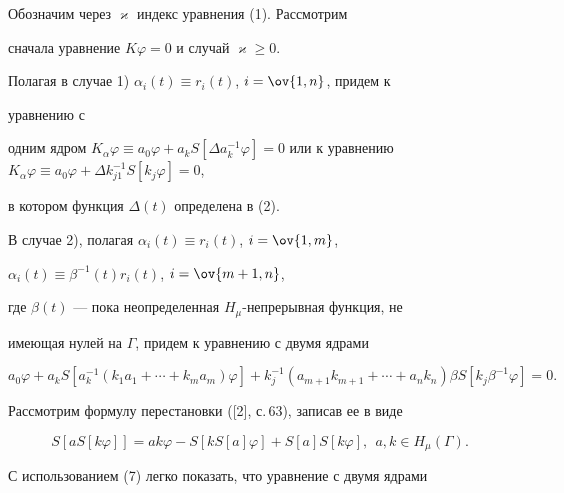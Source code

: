  


\begin{pf} 


Обозначим через $\varkappa$ индекс уравнения (1). Рассмотрим 


сначала уравнение $K\varphi=0$ и случай $\varkappa\ge0$. 


 


Полагая в случае 1) $\alpha_i(t)\equiv r_i(t)$, $i=\ov{1,n}$, придем к 


уравнению с 


одним ядром $K_\alpha\varphi\equiv a_0\varphi+a_k S[\Delta 


a^{-1}_k\varphi]=0$ или к уравнению $K_\alpha\varphi\equiv 


a_0\varphi+\Delta k^{-1}_{j1}S[k_j\varphi]=0$, 


в котором функция $\Delta(t)$ определена в (2). 


 


В случае 2), полагая $\alpha_i(t)\equiv r_i(t)$, $i=\ov{1,m}$, 


$\alpha_i(t)\equiv \beta^{-1}(t)r_i(t)$, $i=\ov{m+1,n}$, 


где $\beta(t)$ --- пока неопределенная $H_\mu$-непрерывная функция, не 


имеющая нулей на $\Gamma$, придем к уравнению с двумя ядрами 


\begin{equation} 


a_0\varphi+a_k S[a^{-1}_k(k_1a_1+\dotsb+k_m a_m)\varphi] 


+k^{-1}_j(a_{m+1}k_{m+1}+\dotsb+a_n k_n)\beta S 


[k_j\beta^{-1}\varphi]=0. 


\end{equation} 


 


Рассмотрим формулу перестановки ([2], с.\,63), записав ее в виде 


\begin{equation} 


S[aS[k\varphi]]=a k\varphi-S[k S[a]\varphi]+ 


S[a]S[k\varphi],\ \ a,k\in H_\mu(\Gamma). 


\end{equation} 


С использованием (7) легко показать, что уравнение с двумя ядрами 



\end{pf}
